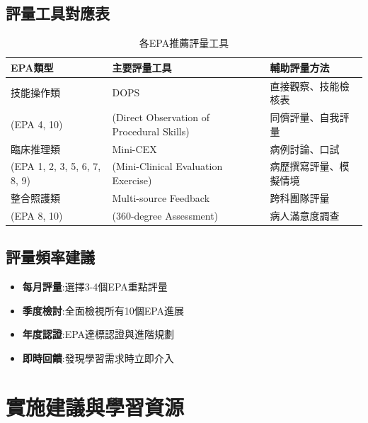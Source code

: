 \documentclass[12pt,a4paper]{article}
\begin{document}
\subsection{評量工具對應表}
\begin{table}[h]
    \centering
    \caption{各EPA推薦評量工具}
    \begin{tabular}{p{4.5cm} p{4cm} p{5.5cm}}
        \toprule
        \textbf{EPA類型} & \textbf{主要評量工具} & \textbf{輔助評量方法} \\
        \midrule
        技能操作類 & DOPS & 直接觀察、技能檢核表 \\
        (EPA 4, 10) & (Direct Observation of Procedural Skills) & 同儕評量、自我評量 \\
        \midrule
        臨床推理類 & Mini-CEX & 病例討論、口試 \\
        (EPA 1, 2, 3, 5, 6, 7, 8, 9) & (Mini-Clinical Evaluation Exercise) & 病歷撰寫評量、模擬情境 \\
        \midrule
        整合照護類 & Multi-source Feedback & 跨科團隊評量 \\
        (EPA 8, 10) & (360-degree Assessment) & 病人滿意度調查 \\
        \bottomrule
    \end{tabular}
\end{table}

\subsection{評量頻率建議}
\begin{itemize}[nosep]
    \item \textbf{每月評量}:選擇3-4個EPA重點評量
    \item \textbf{季度檢討}:全面檢視所有10個EPA進展
    \item \textbf{年度認證}:EPA達標認證與進階規劃
    \item \textbf{即時回饋}:發現學習需求時立即介入
\end{itemize}

\section{實施建議與學習資源}
\end{document}
